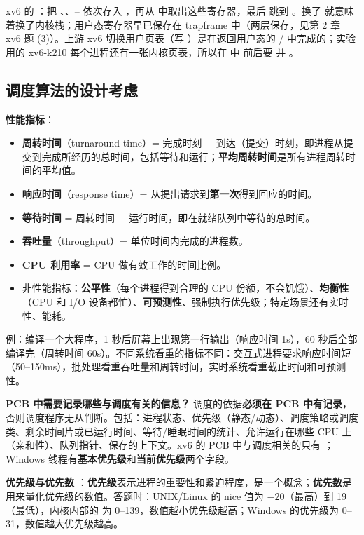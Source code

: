 xv6 的 ：把 、、– 依次存入 ，再从  中取出这些寄存器，最后  跳到 。换了  就意味着换了内核栈；用户态寄存器早已保存在 trapframe 中（两层保存，见第 2 章 xv6 题 (3)）。上游 xv6 切换用户页表（写 ）是在返回用户态的 / 中完成的；实验用的 xv6-k210 每个进程还有一张内核页表，所以在  中  前后要  并 。

\subsection{调度算法的设计考虑}

\textbf{性能指标}：
\begin{itemize}
    \item \textbf{周转时间}（turnaround time）= 完成时刻 $-$ 到达（提交）时刻，即进程从提交到完成所经历的总时间，包括等待和运行；\textbf{平均周转时间}是所有进程周转时间的平均值。
    \item \textbf{响应时间}（response time）= 从提出请求到\textbf{第一次}得到回应的时间。
    \item \textbf{等待时间} = 周转时间 $-$ 运行时间，即在就绪队列中等待的总时间。
    \item \textbf{吞吐量}（throughput）= 单位时间内完成的进程数。
    \item \textbf{CPU 利用率} = CPU 做有效工作的时间比例。
    \item 非性能指标：\textbf{公平性}（每个进程得到合理的 CPU 份额，不会饥饿）、\textbf{均衡性}（CPU 和 I/O 设备都忙）、\textbf{可预测性}、强制执行优先级；特定场景还有实时性、能耗。
\end{itemize}
例：编译一个大程序，1 秒后屏幕上出现第一行输出（响应时间 1s），60 秒后全部编译完（周转时间 60s）。不同系统看重的指标不同：交互式进程要求响应时间短（50–150ms），批处理看重吞吐量和周转时间，实时系统看重截止时间和可预测性。

\textbf{PCB 中需要记录哪些与调度有关的信息？} 调度的依据\textbf{必须在 PCB 中有记录}，否则调度程序无从判断。包括：进程状态、优先级（静态/动态）、调度策略或调度类、剩余时间片或已运行时间、等待/睡眠时间的统计、允许运行在哪些 CPU 上（亲和性）、队列指针、保存的上下文。xv6 的 PCB 中与调度相关的只有 ；Windows 线程有\textbf{基本优先级}和\textbf{当前优先级}两个字段。

\textbf{优先级与优先数} \ez：\textbf{优先级}表示进程的重要性和紧迫程度，是一个概念；\textbf{优先数}是用来量化优先级的数值。答题时：UNIX/Linux 的 nice 值为 $-20$（最高）到 19（最低），内核内部的  为 0–139，数值越小优先级越高；Windows 的优先级为 0–31，数值越大优先级越高。

